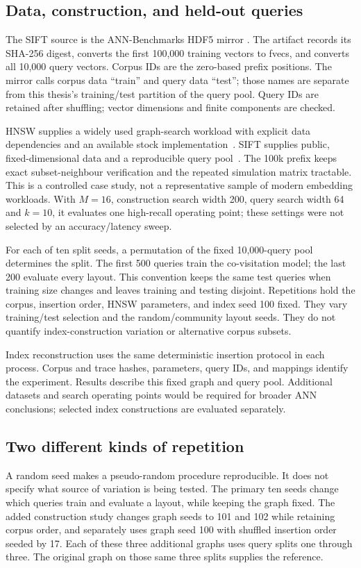 \documentclass[11pt,a4paper]{report}
\begin{document}
\subsection{Data, construction, and held-out queries}
The SIFT source is the ANN-Benchmarks HDF5 mirror \cite{annbench,pq}. The artifact records its SHA-256 digest, converts the first 100,000 training vectors to fvecs, and converts all 10,000 query vectors. Corpus IDs are the zero-based prefix positions. The mirror calls corpus data ``train'' and query data ``test''; those names are separate from this thesis's training/test partition of the query pool. Query IDs are retained after shuffling; vector dimensions and finite components are checked.

HNSW supplies a widely used graph-search workload with explicit data dependencies and an available stock implementation~\cite{hnsw}. SIFT supplies public, fixed-dimensional data and a reproducible query pool~\cite{annbench}. The 100k prefix keeps exact subset-neighbour verification and the repeated simulation matrix tractable. This is a controlled case study, not a representative sample of modern embedding workloads. With $M=16$, construction search width 200, query search width 64 and $k=10$, it evaluates one high-recall operating point; these settings were not selected by an accuracy/latency sweep.

For each of ten split seeds, a permutation of the fixed 10,000-query pool determines the split. The first 500 queries train the co-visitation model; the last 200 evaluate every layout. This convention keeps the same test queries when training size changes and leaves training and testing disjoint. Repetitions hold the corpus, insertion order, HNSW parameters, and index seed 100 fixed. They vary training/test selection and the random/community layout seeds. They do not quantify index-construction variation or alternative corpus subsets.

Index reconstruction uses the same deterministic insertion protocol in each process. Corpus and trace hashes, parameters, query IDs, and mappings identify the experiment. Results describe this fixed graph and query pool. Additional datasets and search operating points would be required for broader ANN conclusions; selected index constructions are evaluated separately.

\subsection{Two different kinds of repetition}
A random seed makes a pseudo-random procedure reproducible. It does not specify what source of variation is being tested. The primary ten seeds change which queries train and evaluate a layout, while keeping the graph fixed. The added construction study changes graph seeds to 101 and 102 while retaining corpus order, and separately uses graph seed 100 with shuffled insertion order seeded by 17. Each of these three additional graphs uses query splits one through three. The original graph on those same three splits supplies the reference.
\end{document}
